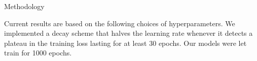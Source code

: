 \documentclass[final,20pt]{beamer}
\newlength{\colwidth}
\begin{document}
\begin{frame}[t, fragile]
\begin{columns}[t]
\begin{column}{\colwidth}
\begin{block}{Methodology}











    Current results are based on the following choices of hyperparameters.
    We implemented a decay scheme that halves the learning rate
    whenever it detects a plateau in the training loss lasting for at least 30 epochs.
    Our models were let train for 1000 epochs.


\end{block}
\end{column}
\end{columns}
\end{frame}
\end{document}
